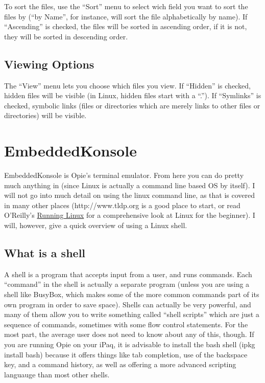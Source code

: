 \documentclass[12pt,letterpaper,oneside, openany]{book} \usepackage[latin1] {inputenc}
\begin{document}
To sort the files, use the ``Sort'' menu to select wich field you want to sort the files by (``by Name'', for instance, will sort the file alphabetically by name). If ``Ascending'' is checked, the files will be sorted in ascending order, if it is not, they will be sorted in descending order. 

\section{Viewing Options}

The ``View'' menu lets you choose which files you view. If ``Hidden'' is checked, hidden files will be visible (in Linux, hidden files start with a ``.''). If ``Symlinks'' is checked, symbolic links (files or directories which are merely links to other files or directories) will be visible.

\chapter{EmbeddedKonsole}
EmbeddedKonsole is Opie's terminal emulator.  From here you can do pretty much anything in (since Linux is actually a command line based OS by itself).  I will not go into much detail on using the linux command line, as that is covered in many other places (http://www.tldp.org is a good place to start, or read O'Reilly's \underline{Running Linux} for a comprehensive look at Linux for the beginner).  I will, however, give a quick overview of using a Linux shell.

\section{What is a shell}

A shell is a program that accepts input from a user, and runs commands.  Each ``command'' in the shell is actually a separate program (unless you are using a shell like BusyBox, which makes some of the more common commands part of its own program in order to save space).  Shells can actually be very powerful, and many of them allow you to write something called ``shell scripts'' which are just a sequence of commands, sometimes with some flow control statements.  For the most part, the average user does not need to know about any of this, though.  If you are running Opie on your iPaq, it is advisable to install the bash shell (ipkg install bash) because it offers things like tab completion, use of the backspace key, and a command history, as well as offering a more advanced scripting languauge than most other shells.
\end{document}
